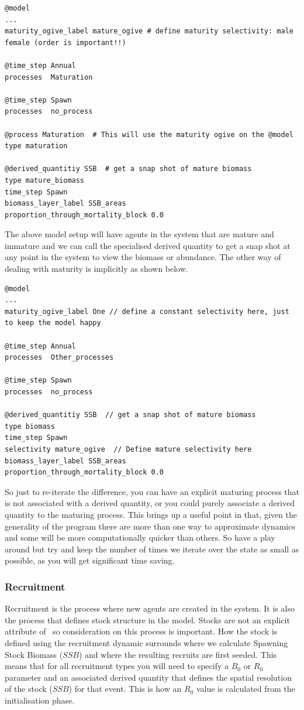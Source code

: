 {\small{\begin{verbatim}
@model
...
maturity_ogive_label mature_ogive # define maturity selectivity: male female (order is important!!)

@time_step Annual
processes  Maturation 

@time_step Spawn
processes  no_process 

@process Maturation  # This will use the maturity ogive on the @model
type maturation

@derived_quantitiy SSB  # get a snap shot of mature biomass
type mature_biomass
time_step Spawn
biomass_layer_label SSB_areas
proportion_through_mortality_block 0.0
\end{verbatim}}}

The above model setup will have agents in the system that are mature and immature and we can call the specialised  derived quantity to get a snap shot at any point in the system to view the biomass or abundance. The other way of dealing with maturity is implicitly as shown below.

{\small{\begin{verbatim}
@model
...
maturity_ogive_label One // define a constant selectivity here, just to keep the model happy

@time_step Annual
processes  Other_processes

@time_step Spawn
processes  no_process 	
	
@derived_quantitiy SSB  // get a snap shot of mature biomass
type biomass
time_step Spawn
selectivity mature_ogive  // Define mature selectivity here
biomass_layer_label SSB_areas
proportion_through_mortality_block 0.0
\end{verbatim}}}

So just to re-iterate the difference, you can have an explicit maturing process that is not associated with a derived quantity, or you could purely associate a derived quantity to the maturing process. This brings up a useful point in that, given the generality of the program there are more than one way to approximate dynamics and some will be more computationally quicker than others. So have a play around but try and keep the number of times we iterate over the state as small as possible, as you will get significant time saving.


\subsubsection{Recruitment}
Recruitment is the process where new agents are created in the system. It is also the process that defines stock structure in the model. Stocks are not an explicit attribute of \IBM\ so consideration on this process is important. How the stock is defined using the recruitment dynamic surrounds where we calculate Spawning Stock Biomass ($SSB$) and where the resulting recruits are first seeded. This means that for all recruitment types you will need to specify a $B_0$ or \(R_0\) parameter and an associated derived quantity that defines the spatial resolution of the stock ($SSB$) for that event. This is how an $R_0$ value is calculated from the initialisation phase.

